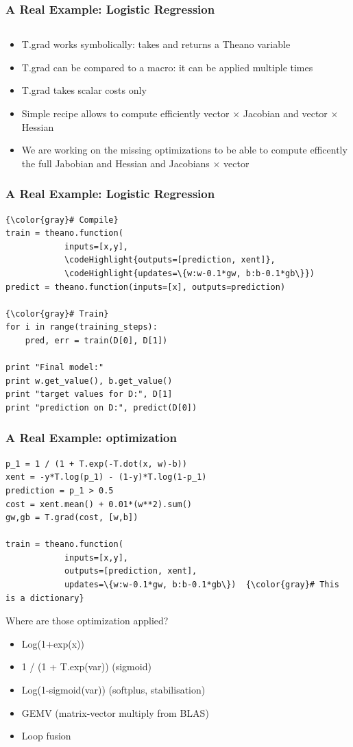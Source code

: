 \documentclass[a4paper,9pt]{beamer}
\begin{document}
\begin{frame}[fragile]
  \frametitle{A Real Example: Logistic Regression}
\begin{Verbatim}[commandchars=\\\{\}]

\end{Verbatim}
\begin{itemize}
\item T.grad works symbolically: takes and returns a Theano variable
\item T.grad can be compared to a macro: it can be applied multiple times
\item T.grad takes scalar costs only
\item Simple recipe allows to compute efficiently vector $\times$ Jacobian and vector $\times$ Hessian
\item We are working on the missing optimizations to be able to compute efficently the full Jabobian and Hessian and Jacobians $\times$ vector
\end{itemize}
\end{frame}

\begin{frame}[fragile]
  \frametitle{A Real Example: Logistic Regression}
\begin{Verbatim}[commandchars=\\\{\}]
{\color{gray}# Compile}
train = theano.function(
            inputs=[x,y],
            \codeHighlight{outputs=[prediction, xent]},
            \codeHighlight{updates=\{w:w-0.1*gw, b:b-0.1*gb\}})
predict = theano.function(inputs=[x], outputs=prediction)

{\color{gray}# Train}
for i in range(training_steps):
    pred, err = train(D[0], D[1])

print "Final model:"
print w.get_value(), b.get_value()
print "target values for D:", D[1]
print "prediction on D:", predict(D[0])
\end{Verbatim}
\end{frame}

\begin{frame}[fragile]
  \frametitle{A Real Example: optimization}
\begin{Verbatim}[commandchars=\\\{\}]
p_1 = 1 / (1 + T.exp(-T.dot(x, w)-b))
xent = -y*T.log(p_1) - (1-y)*T.log(1-p_1)
prediction = p_1 > 0.5
cost = xent.mean() + 0.01*(w**2).sum()
gw,gb = T.grad(cost, [w,b])

train = theano.function(
            inputs=[x,y],
            outputs=[prediction, xent],
            updates=\{w:w-0.1*gw, b:b-0.1*gb\})  {\color{gray}# This is a dictionary}
\end{Verbatim}
Where are those optimization applied?
\begin{itemize}
\item Log(1+exp(x))
\item 1 / (1 + T.exp(var)) (sigmoid)
\item Log(1-sigmoid(var)) (softplus, stabilisation)
\item GEMV (matrix-vector multiply from BLAS)
\item Loop fusion
\end{itemize}
\end{frame}
\end{document}
